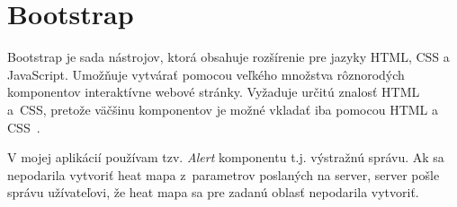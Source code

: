 \section{Bootstrap}
Bootstrap je sada nástrojov, ktorá obsahuje rozšírenie pre jazyky HTML, CSS a JavaScript. Umožňuje vytvárať pomocou veľkého množstva rôznorodých komponentov interaktívne webové stránky. Vyžaduje určitú znalosť HTML a~CSS, pretože väčšinu komponentov je možné vkladať iba pomocou HTML a CSS~\cite{bootstrap}.

V mojej aplikácií používam tzv. \emph{Alert} komponentu t.j. výstražnú správu. Ak sa nepodarila vytvoriť heat mapa z~parametrov poslaných na server, server pošle správu užívateľovi, že heat mapa sa pre zadanú oblasť nepodarila vytvoriť.















